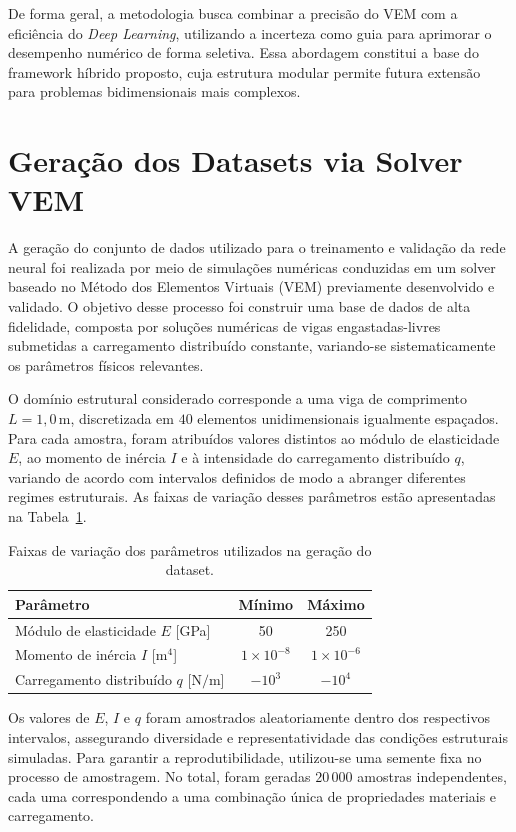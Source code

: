 \documentclass[12pt,openright,oneside,a4paper,english,brazil]{abntex2}
\begin{document}
De forma geral, a metodologia busca combinar a precisão do VEM com a eficiência do \textit{Deep Learning}, utilizando a incerteza como guia para aprimorar o desempenho numérico de forma seletiva. Essa abordagem constitui a base do framework híbrido proposto, cuja estrutura modular permite futura extensão para problemas bidimensionais mais complexos.

%
\section{Geração dos Datasets via Solver VEM}

A geração do conjunto de dados utilizado para o treinamento e validação da rede neural foi realizada por meio de simulações numéricas conduzidas em um solver baseado no Método dos Elementos Virtuais (VEM) previamente desenvolvido e validado. O objetivo desse processo foi construir uma base de dados de alta fidelidade, composta por soluções numéricas de vigas engastadas-livres submetidas 
a carregamento distribuído constante, variando-se sistematicamente os parâmetros físicos relevantes.

O domínio estrutural considerado corresponde a uma viga de comprimento $L = 1{,}0\,\mathrm{m}$, discretizada em $40$ elementos unidimensionais igualmente espaçados. Para cada amostra, foram atribuídos valores distintos ao módulo de elasticidade $E$, ao momento de inércia $I$ e à intensidade do carregamento distribuído $q$, variando de acordo com intervalos definidos de modo a abranger 
diferentes regimes estruturais. As faixas de variação desses parâmetros estão apresentadas na Tabela~\ref{tab:dataset_ranges}.

\begin{table}[H]
\centering
\caption{Faixas de variação dos parâmetros utilizados na geração do dataset.}
\label{tab:dataset_ranges}
\begin{tabular}{lcc}
\hline
\textbf{Parâmetro} & \textbf{Mínimo} & \textbf{Máximo} \\ \hline
Módulo de elasticidade $E$ [GPa] & 50 & 250 \\
Momento de inércia $I$ [$\mathrm{m^4}$] & $1\times10^{-8}$ & $1\times10^{-6}$ \\
Carregamento distribuído $q$ [$\mathrm{N/m}$] & $-10^3$ & $-10^4$ \\ \hline
\end{tabular}
\end{table}

Os valores de $E$, $I$ e $q$ foram amostrados aleatoriamente dentro dos respectivos intervalos, assegurando diversidade e representatividade das condições estruturais simuladas. Para garantir a reprodutibilidade, utilizou-se uma semente fixa no processo de amostragem. No total, foram geradas $20\,000$ amostras independentes, cada uma correspondendo a uma combinação única de 
propriedades materiais e carregamento.
\end{document}
